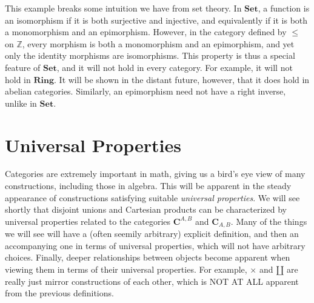 This example breaks some intuition we have from set theory. In $\mathbf{Set}$, a function is an isomorphism if it is both surjective and injective, and equivalently if it is both a monomorphism and an epimorphism. However, in the category defined by $\leq $ on $\mathbb{Z}$, every morphism is both a monomorphism and an epimorphism, and yet only the identity morphisms are isomorphisms. This property is thus a special feature of $\mathbf{Set}$, and it will not hold in every category. For example, it will not hold in $\mathbf{Ring}$. It will be shown in the distant future, however, that it does hold in abelian categories. Similarly, an epimorphism need not have a right inverse, unlike in $\mathbf{Set}$.

\section{Universal Properties}
Categories are extremely important in math, giving us a bird's eye view of many constructions, including those in algebra. This will be apparent in the steady appearance of constructions satisfying suitable \emph{universal properties}. We will see shortly that disjoint unions and Cartesian products can be characterized by universal properties related to the categories $\mathbf{C}^{A,B}$ and $\mathbf{C}_{A,B}$. Many of the things we will see will have a (often seemily arbitrary) explicit definition, and then an accompanying one in terms of universal properties, which will not have arbitrary choices. Finally, deeper relationships between objects become apparent when viewing them in terms of their universal properties. For example, $\times $ and $\amalg $ are really just mirror constructions of each other, which is NOT AT ALL apparent from the previous definitions.
